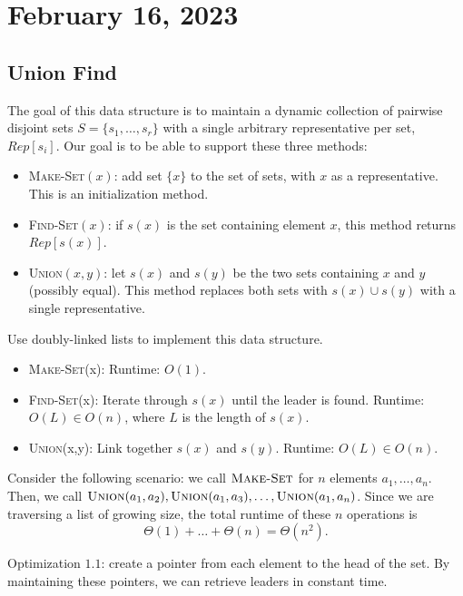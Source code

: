 \section{February 16, 2023}

\subsection{Union Find}

The goal of this data structure is to maintain a dynamic collection of pairwise disjoint sets $S = \{s_1, \hdots, s_r\}$ with a single arbitrary representative per set, $Rep[s_i]$. Our goal is to be able to support these three methods: 
\begin{itemize}
    \item \textsc{Make-Set}$(x)$: add set $\{x\}$ to the set of sets, with $x$ as a representative. This is an initialization method.
    \item \textsc{Find-Set}$(x)$: if $s(x)$ is the set containing element $x$, this method returns $Rep[s(x)]$.
    \item \textsc{Union}$(x,y)$: let $s(x)$ and $s(y)$ be the two sets containing $x$ and $y$ (possibly equal). This method replaces both sets with $s(x)\cup s(y)$ with a single representative.
\end{itemize}

\begin{example}
\exlabel

Use doubly-linked lists to implement this data structure. 
\end{example}

\begin{itemize}
    \item \textsc{Make-Set}(x): Runtime: $O(1)$. 
    \item \textsc{Find-Set}(x): Iterate through $s(x)$ until the leader is found. Runtime: $O(L)\in O(n)$, where $L$ is the length of $s(x)$.
    \item \textsc{Union}(x,y): Link together $s(x)$ and $s(y)$. Runtime: $O(L)\in O(n)$.
\end{itemize}

Consider the following scenario: we call $\textsc{Make-Set}$ for $n$ elements $a_1, \hdots, a_n$. Then, we call $\textsc{Union}(a_1, a_2), \textsc{Union}(a_1, a_3), \hdots, \textsc{Union}(a_1, a_n)$. Since we are traversing a list of growing size, the total runtime of these $n$ operations is 
\[\Theta(1) + \hdots + \Theta(n) = \Theta(n^2).\]

\begin{example}
\exlabel

Optimization $1.1$: create a pointer from each element to the head of the set. By maintaining these pointers, we can retrieve leaders in constant time. 
\end{example}

